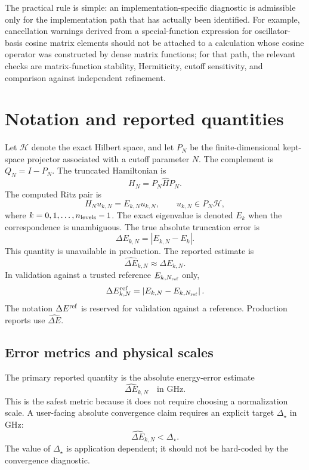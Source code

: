 \documentclass[11pt,a4paper]{article}
\newcommand{\abs}[1]{\left|#1\right|}
\newcommand{\Hhat}{\widehat H}
\newcommand{\errhat}{\widehat{\Delta E}}
\newcommand{\errtrue}{\Delta E^{\rm ref}}
\begin{document}
The practical rule is simple: an implementation-specific diagnostic is admissible only for the implementation path that has actually been identified.  For example, cancellation warnings derived from a special-function expression for oscillator-basis cosine matrix elements should not be attached to a calculation whose cosine operator was constructed by dense matrix functions; for that path, the relevant checks are matrix-function stability, Hermiticity, cutoff sensitivity, and comparison against independent refinement.

\section{Notation and reported quantities}
\label{sec:notation}

Let $\mathcal H$ denote the exact Hilbert space, and let $P_N$ be the finite-dimensional kept-space projector associated with a cutoff parameter $N$.  The complement is $Q_N=I-P_N$.  The truncated Hamiltonian is
\begin{equation}
  H_N=P_N\Hhat P_N.
\end{equation}
The computed Ritz pair is
\begin{equation}
  H_N u_{k,N}=E_{k,N}u_{k,N},\qquad u_{k,N}\in P_N\mathcal H,
\end{equation}
where $k=0,1,\ldots,n_{\rm levels}-1$.  The exact eigenvalue is denoted $E_k$ when the correspondence is unambiguous.  The true absolute truncation error is
\begin{equation}
  \Delta E_{k,N}=\abs{E_{k,N}-E_k}.
\end{equation}
This quantity is unavailable in production.  The reported estimate is
\begin{equation}
  \errhat_{k,N}\approx \Delta E_{k,N}.
\end{equation}
In validation against a trusted reference $E_{k,N_{\rm ref}}$ only,
\begin{equation}
  \errtrue_{k,N}=\abs{E_{k,N}-E_{k,N_{\rm ref}}}.
\end{equation}
The notation $\errtrue$ is reserved for validation against a reference.  Production reports use $\errhat$.


\subsection{Error metrics and physical scales}

The primary reported quantity is the absolute energy-error estimate
\begin{equation}
  \errhat_{k,N}\quad \text{in GHz}.
\end{equation}
This is the safest metric because it does not require choosing a normalization scale.  A user-facing absolute convergence claim requires an explicit target \(\Delta_\star\) in GHz:
\begin{equation}
  \errhat_{k,N}<\Delta_\star.
\end{equation}
The value of \(\Delta_\star\) is application dependent; it should not be hard-coded by the convergence diagnostic.
\end{document}
